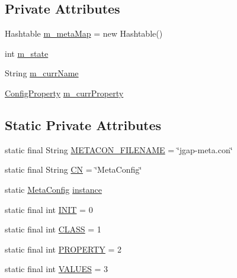 \subsection*{Private Attributes}
\begin{DoxyCompactItemize}
\item 
Hashtable \hyperlink{classorg_1_1jgap_1_1data_1_1config_1_1_meta_config_a692ba697bf86f532083730ea8d3ff91b}{m\-\_\-meta\-Map} = new Hashtable()
\item 
int \hyperlink{classorg_1_1jgap_1_1data_1_1config_1_1_meta_config_a5da330e8f7e6f0e2f65032b181d18051}{m\-\_\-state}
\item 
String \hyperlink{classorg_1_1jgap_1_1data_1_1config_1_1_meta_config_a7a701adbf221113e4e247b43f9fd1dbf}{m\-\_\-curr\-Name}
\item 
\hyperlink{classorg_1_1jgap_1_1data_1_1config_1_1_config_property}{Config\-Property} \hyperlink{classorg_1_1jgap_1_1data_1_1config_1_1_meta_config_a21f4bed08700236ddc9ef5b1cfe78fd5}{m\-\_\-curr\-Property}
\end{DoxyCompactItemize}
\subsection*{Static Private Attributes}
\begin{DoxyCompactItemize}
\item 
static final String \hyperlink{classorg_1_1jgap_1_1data_1_1config_1_1_meta_config_aef46416edb3999cd12cf116ffad899f5}{M\-E\-T\-A\-C\-O\-N\-\_\-\-F\-I\-L\-E\-N\-A\-M\-E} = \char`\"{}jgap-\/meta.\-con\char`\"{}
\item 
static final String \hyperlink{classorg_1_1jgap_1_1data_1_1config_1_1_meta_config_a84ef3b26d6d1069dce136cf95b5b2fd9}{C\-N} = \char`\"{}Meta\-Config\char`\"{}
\item 
static \hyperlink{classorg_1_1jgap_1_1data_1_1config_1_1_meta_config}{Meta\-Config} \hyperlink{classorg_1_1jgap_1_1data_1_1config_1_1_meta_config_a800bdf701204298e4e8474faf5e7d76d}{instance}
\item 
static final int \hyperlink{classorg_1_1jgap_1_1data_1_1config_1_1_meta_config_a69e6171ae60590befec61ab139eb2962}{I\-N\-I\-T} = 0
\item 
static final int \hyperlink{classorg_1_1jgap_1_1data_1_1config_1_1_meta_config_a0c165ded2590ee31d13027973830bfc3}{C\-L\-A\-S\-S} = 1
\item 
static final int \hyperlink{classorg_1_1jgap_1_1data_1_1config_1_1_meta_config_ad92a85d07a261b96d4e1ce3811a113e7}{P\-R\-O\-P\-E\-R\-T\-Y} = 2
\item 
static final int \hyperlink{classorg_1_1jgap_1_1data_1_1config_1_1_meta_config_aeaf0976d28b9757e8f037c64ffb935fd}{V\-A\-L\-U\-E\-S} = 3
\end{DoxyCompactItemize}


